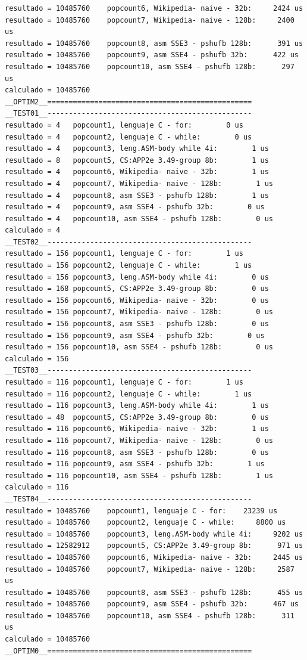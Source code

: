 \begin{lstlisting}[frame=single]
resultado = 10485760	popcount6, Wikipedia- naive - 32b:     2424 us
resultado = 10485760	popcount7, Wikipedia- naive - 128b:     2400 us
resultado = 10485760	popcount8, asm SSE3 - pshufb 128b:      391 us
resultado = 10485760	popcount9, asm SSE4 - pshufb 32b:      422 us
resultado = 10485760	popcount10, asm SSE4 - pshufb 128b:      297 us
calculado = 10485760
__OPTIM2__================================================
__TEST01__------------------------------------------------
resultado = 4	popcount1, lenguaje C - for:        0 us
resultado = 4	popcount2, lenguaje C - while:        0 us
resultado = 4	popcount3, leng.ASM-body while 4i:        1 us
resultado = 8	popcount5, CS:APP2e 3.49-group 8b:        1 us
resultado = 4	popcount6, Wikipedia- naive - 32b:        1 us
resultado = 4	popcount7, Wikipedia- naive - 128b:        1 us
resultado = 4	popcount8, asm SSE3 - pshufb 128b:        1 us
resultado = 4	popcount9, asm SSE4 - pshufb 32b:        0 us
resultado = 4	popcount10, asm SSE4 - pshufb 128b:        0 us
calculado = 4
__TEST02__------------------------------------------------
resultado = 156	popcount1, lenguaje C - for:        1 us
resultado = 156	popcount2, lenguaje C - while:        1 us
resultado = 156	popcount3, leng.ASM-body while 4i:        0 us
resultado = 168	popcount5, CS:APP2e 3.49-group 8b:        0 us
resultado = 156	popcount6, Wikipedia- naive - 32b:        0 us
resultado = 156	popcount7, Wikipedia- naive - 128b:        0 us
resultado = 156	popcount8, asm SSE3 - pshufb 128b:        0 us
resultado = 156	popcount9, asm SSE4 - pshufb 32b:        0 us
resultado = 156	popcount10, asm SSE4 - pshufb 128b:        0 us
calculado = 156
__TEST03__------------------------------------------------
resultado = 116	popcount1, lenguaje C - for:        1 us
resultado = 116	popcount2, lenguaje C - while:        1 us
resultado = 116	popcount3, leng.ASM-body while 4i:        1 us
resultado = 48	popcount5, CS:APP2e 3.49-group 8b:        0 us
resultado = 116	popcount6, Wikipedia- naive - 32b:        1 us
resultado = 116	popcount7, Wikipedia- naive - 128b:        0 us
resultado = 116	popcount8, asm SSE3 - pshufb 128b:        0 us
resultado = 116	popcount9, asm SSE4 - pshufb 32b:        1 us
resultado = 116	popcount10, asm SSE4 - pshufb 128b:        1 us
calculado = 116
__TEST04__------------------------------------------------
resultado = 10485760	popcount1, lenguaje C - for:    23239 us
resultado = 10485760	popcount2, lenguaje C - while:     8800 us
resultado = 10485760	popcount3, leng.ASM-body while 4i:     9202 us
resultado = 12582912	popcount5, CS:APP2e 3.49-group 8b:      971 us
resultado = 10485760	popcount6, Wikipedia- naive - 32b:     2445 us
resultado = 10485760	popcount7, Wikipedia- naive - 128b:     2587 us
resultado = 10485760	popcount8, asm SSE3 - pshufb 128b:      455 us
resultado = 10485760	popcount9, asm SSE4 - pshufb 32b:      467 us
resultado = 10485760	popcount10, asm SSE4 - pshufb 128b:      311 us
calculado = 10485760
__OPTIM0__================================================


\end{lstlisting}

